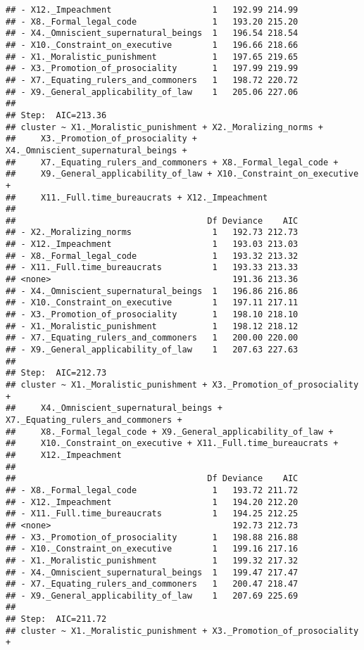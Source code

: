\documentclass[
]{article}
\begin{document}
\begin{verbatim}
## - X12._Impeachment                    1   192.99 214.99
## - X8._Formal_legal_code               1   193.20 215.20
## - X4._Omniscient_supernatural_beings  1   196.54 218.54
## - X10._Constraint_on_executive        1   196.66 218.66
## - X1._Moralistic_punishment           1   197.65 219.65
## - X3._Promotion_of_prosociality       1   197.99 219.99
## - X7._Equating_rulers_and_commoners   1   198.72 220.72
## - X9._General_applicability_of_law    1   205.06 227.06
## 
## Step:  AIC=213.36
## cluster ~ X1._Moralistic_punishment + X2._Moralizing_norms + 
##     X3._Promotion_of_prosociality + X4._Omniscient_supernatural_beings + 
##     X7._Equating_rulers_and_commoners + X8._Formal_legal_code + 
##     X9._General_applicability_of_law + X10._Constraint_on_executive + 
##     X11._Full.time_bureaucrats + X12._Impeachment
## 
##                                      Df Deviance    AIC
## - X2._Moralizing_norms                1   192.73 212.73
## - X12._Impeachment                    1   193.03 213.03
## - X8._Formal_legal_code               1   193.32 213.32
## - X11._Full.time_bureaucrats          1   193.33 213.33
## <none>                                    191.36 213.36
## - X4._Omniscient_supernatural_beings  1   196.86 216.86
## - X10._Constraint_on_executive        1   197.11 217.11
## - X3._Promotion_of_prosociality       1   198.10 218.10
## - X1._Moralistic_punishment           1   198.12 218.12
## - X7._Equating_rulers_and_commoners   1   200.00 220.00
## - X9._General_applicability_of_law    1   207.63 227.63
## 
## Step:  AIC=212.73
## cluster ~ X1._Moralistic_punishment + X3._Promotion_of_prosociality + 
##     X4._Omniscient_supernatural_beings + X7._Equating_rulers_and_commoners + 
##     X8._Formal_legal_code + X9._General_applicability_of_law + 
##     X10._Constraint_on_executive + X11._Full.time_bureaucrats + 
##     X12._Impeachment
## 
##                                      Df Deviance    AIC
## - X8._Formal_legal_code               1   193.72 211.72
## - X12._Impeachment                    1   194.20 212.20
## - X11._Full.time_bureaucrats          1   194.25 212.25
## <none>                                    192.73 212.73
## - X3._Promotion_of_prosociality       1   198.88 216.88
## - X10._Constraint_on_executive        1   199.16 217.16
## - X1._Moralistic_punishment           1   199.32 217.32
## - X4._Omniscient_supernatural_beings  1   199.47 217.47
## - X7._Equating_rulers_and_commoners   1   200.47 218.47
## - X9._General_applicability_of_law    1   207.69 225.69
## 
## Step:  AIC=211.72
## cluster ~ X1._Moralistic_punishment + X3._Promotion_of_prosociality + 

\end{verbatim}
\end{document}
